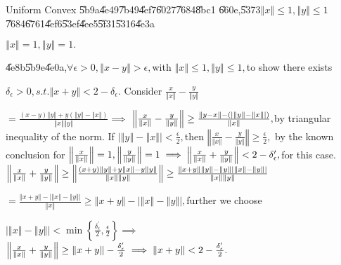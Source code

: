 \documentclass{article}
\begin{document}
Uniform Convex \U{5b9a}\U{4e49}\U{7b49}\U{4ef7}\U{6027}\U{7684}\U{8bc1}%
\U{660e},\U{5373}$\left\Vert x\right\Vert \leq 1,\left\Vert y\right\Vert
\leq 1$\U{7684}\U{6761}\U{4ef6}\U{53ef}\U{4ee5}\U{5f31}\U{5316}\U{4e3a}

$\left\Vert x\right\Vert =1,\left\Vert y\right\Vert =1.$

\U{4e8b}\U{5b9e}\U{4e0a},$\forall \epsilon >0,\left\Vert x-y\right\Vert
>\epsilon ,$with $\left\Vert x\right\Vert \leq 1,\left\Vert y\right\Vert
\leq 1,$to show there exists

$\delta _{\epsilon }>0,s.t.\left\Vert x+y\right\Vert <2-\delta _{\epsilon }.$
Consider $\frac{x}{\left\Vert x\right\Vert }-\frac{y}{\left\Vert
y\right\Vert }$

$=\frac{\left( x-y\right) \left\Vert y\right\Vert +y\left( \left\Vert
y\right\Vert -\left\Vert x\right\Vert \right) }{\left\Vert x\right\Vert
\left\Vert y\right\Vert }\implies $ $\left\Vert \frac{x}{\left\Vert
x\right\Vert }-\frac{y}{\left\Vert y\right\Vert }\right\Vert \geq \frac{%
\left\Vert y-x\right\Vert -\left( \left\vert \left\Vert y\right\Vert
-\left\Vert x\right\Vert \right\vert \right) }{\left\Vert x\right\Vert },$by
triangular inequality of the norm. If $\left\vert \left\Vert y\right\Vert
-\left\Vert x\right\Vert \right\vert <\frac{\epsilon }{2},$then $\left\Vert 
\frac{x}{\left\Vert x\right\Vert }-\frac{y}{\left\Vert y\right\Vert }%
\right\Vert \geq \frac{\epsilon }{2},$ by the known conclusion for $%
\left\Vert \frac{x}{\left\Vert x\right\Vert }\right\Vert =1,\left\Vert \frac{%
y}{\left\Vert y\right\Vert }\right\Vert =1\implies \left\Vert \frac{x}{%
\left\Vert x\right\Vert }+\frac{y}{\left\Vert y\right\Vert }\right\Vert
<2-\delta _{\epsilon }^{\prime },$for this case. $\left\Vert \frac{x}{%
\left\Vert x\right\Vert }+\frac{y}{\left\Vert y\right\Vert }\right\Vert \geq
\left\Vert \frac{\left( x+y\right) \left\Vert y\right\Vert +y\left\Vert
x\right\Vert -y\left\Vert y\right\Vert }{\left\Vert x\right\Vert \left\Vert
y\right\Vert }\right\Vert \geq \frac{\left\Vert x+y\right\Vert \left\Vert
y\right\Vert -\left\Vert y\right\Vert \left\vert \left\Vert x\right\Vert
-\left\Vert y\right\Vert \right\vert }{\left\Vert x\right\Vert \left\Vert
y\right\Vert }$

$=\frac{\left\Vert x+y\right\Vert -\left\vert \left\Vert x\right\Vert
-\left\Vert y\right\Vert \right\vert }{\left\Vert x\right\Vert }\geq
\left\Vert x+y\right\Vert -\left\vert \left\Vert x\right\Vert -\left\Vert
y\right\Vert \right\vert ,$further we choose

$\left\vert \left\Vert x\right\Vert -\left\Vert y\right\Vert \right\vert
<\min \left\{ \frac{\delta _{\epsilon }^{\prime }}{2},\frac{\epsilon }{2}%
\right\} \implies $ $\left\Vert \frac{x}{\left\Vert x\right\Vert }+\frac{y}{%
\left\Vert y\right\Vert }\right\Vert \geq \left\Vert x+y\right\Vert -\frac{%
\delta _{\epsilon }^{\prime }}{2}\implies \left\Vert x+y\right\Vert <2-\frac{%
\delta _{\epsilon }^{\prime }}{2}.$
\end{document}
